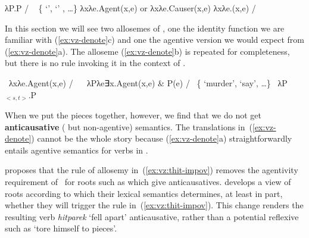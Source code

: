 \begin{exe}
\begin{xlist}
\begin{xlist}
\begin{exe}
\begin{xlist}
\begin{xlist}
\begin{exe}
\begin{xlist}
\begin{xlist}
\begin{exe}
\begin{exe}
\begin{xlist}
\begin{exe}
\begin{exe}
\begin{xlist}
\begin{exe}
\begin{exe}
\begin{exe}
\begin{exe}
\begin{exe}
\begin{xlist}
\begin{exe}
\begin{xlist}
\begin{exe}
\begin{exe}
\begin{xlist}
\begin{exe}
\begin{xlist}
\begin{exe}
\begin{xlist}
\begin{exe}
\begin{exe}
\begin{exe}
\begin{xlist}
\begin{exe}
\begin{exe}
\begin{exe}
\begin{xlist}
\begin{exe}
\begin{xlist}
\begin{exe}
\begin{xlist}
\begin{exe}
\begin{xlist}
\begin{exe}
\begin{exe}
\begin{exe}
\begin{exe}
\begin{xlist}
\begin{exe}
\begin{xlist}
\begin{exe}
\begin{xlist}
\begin{exe}
\begin{xlist}
\begin{exe}
\begin{xlist}
\begin{exe}
\begin{xlist}
\begin{exe}
\begin{exe}
\begin{exe}
\begin{exe}
\begin{xlist}
\begin{exe}
\begin{xlist}
\begin{exe}
\begin{xlist}
\begin{exe}
\begin{exe}
\begin{xlist}
\begin{exe}
\begin{xlist}
\begin{exe}
\begin{exe}
\begin{exe}
\begin{exe}
\begin{xlist}
\begin{xlist}
\begin{exe}
\begin{xlist}
\begin{exe}
\begin{exe}
\begin{exe}
\begin{xlist}
\begin{exe}
\begin{exe}
\begin{xlist}
\begin{exe}
\begin{exe}
\begin{exe}
\begin{xlist}
\begin{xlist}
\begin{exe}
\begin{xlist}
\begin{exe}
\begin{exe}
\begin{exe}
\begin{exe}
\begin{xlist}
\begin{exe}
\begin{xlist}
\begin{exe}
 \begin{xlist} 
 	\ex  λP.P \phantom{agent(x,e)xxx} / \trace~ \{  `',  `' , \dots \} 
 	\ex  λxλe.Agent(x,e) or λxλe.Causer(x,e) 
 	\ex  λxλe.(x,e) / \trace~\va 
 \z
\z 

In this section we will see two allosemes of {\vz}, one the identity function we are familiar with (\ref{ex:vz-denote}c) and one the agentive version we would expect from {\va} (\ref{ex:vz-denote}a). The  alloseme (\ref{ex:vz-denote}b) is repeated for completeness, but there is no rule invoking it in the context of {\va}.
 \begin{exe}
 \ex  \label{ex:vz-denote} 
 \begin{xlist} 
 	\ex  \denote{\vz} \lra~λxλe.Agent(x,e) / \trace~\va 
 	\ex  \denote{\vz} \lra~λPλe∃x.Agent(x,e) \& P(e) / \trace~\{ `murder',  `say’, \dots\} 
 	\ex  \denote{\vz} \lra~λP$_{<s,t>}$.P 
 \z
\z 

When we put the pieces together, however, we find that we do not get \textbf{anticausative} ( but non-agentive) semantics. The translations in~(\ref{ex:vz-denote}) cannot be the whole story because (\ref{ex:vz-denote}a) straightforwardly entails agentive semantics for verbs in {\thit}.

\cite{kastner17gjgl} proposes that the rule of allosemy in~(\ref{ex:vz:thit-impov}) removes the agentivity requirement of {\va}~for roots such as  which give anticausatives. \cite{kastner16phd,kastner17gjgl} develops a view of roots according to which their lexical semantics determines, at least in part, whether they will trigger the rule in~(\ref{ex:vz:thit-impov}). This change renders the resulting verb \emph{hitparek} `fell apart' anticausative, rather than a potential reflexive such as `tore himself to pieces'.
 \begin{exe}
\ex 
\end{exe}
\end{xlist}
\end{exe}
\end{xlist}
\end{exe}
\end{xlist}
\end{exe}
\end{xlist}
\end{exe}
\end{exe}
\end{exe}
\end{exe}
\end{xlist}
\end{exe}
\end{xlist}
\end{xlist}
\end{exe}
\end{exe}
\end{exe}
\end{xlist}
\end{exe}
\end{exe}
\end{xlist}
\end{exe}
\end{exe}
\end{exe}
\end{xlist}
\end{exe}
\end{xlist}
\end{xlist}
\end{exe}
\end{exe}
\end{exe}
\end{exe}
\end{xlist}
\end{exe}
\end{xlist}
\end{exe}
\end{exe}
\end{xlist}
\end{exe}
\end{xlist}
\end{exe}
\end{xlist}
\end{exe}
\end{exe}
\end{exe}
\end{exe}
\end{xlist}
\end{exe}
\end{xlist}
\end{exe}
\end{xlist}
\end{exe}
\end{xlist}
\end{exe}
\end{xlist}
\end{exe}
\end{xlist}
\end{exe}
\end{exe}
\end{exe}
\end{exe}
\end{xlist}
\end{exe}
\end{xlist}
\end{exe}
\end{xlist}
\end{exe}
\end{xlist}
\end{exe}
\end{exe}
\end{exe}
\end{xlist}
\end{exe}
\end{exe}
\end{exe}
\end{xlist}
\end{exe}
\end{xlist}
\end{exe}
\end{xlist}
\end{exe}
\end{exe}
\end{xlist}
\end{exe}
\end{xlist}
\end{exe}
\end{exe}
\end{exe}
\end{exe}
\end{exe}
\end{xlist}
\end{exe}
\end{exe}
\end{xlist}
\end{exe}
\end{exe}
\end{xlist}
\end{xlist}
\end{exe}
\end{xlist}
\end{xlist}
\end{exe}
\end{xlist}
\end{xlist}
\end{exe}

